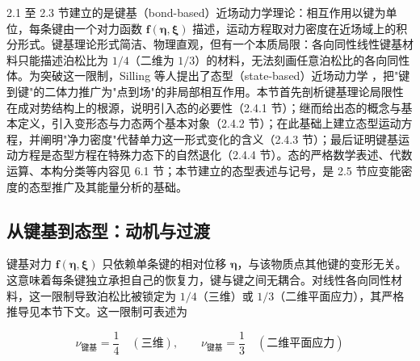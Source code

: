2.1 至 2.3 节建立的是键基（bond-based）近场动力学理论：相互作用以键为单位，每条键由一个对力函数 $\mathbf{f}(\boldsymbol{\eta},\boldsymbol{\xi})$ 描述，运动方程取对力密度在近场域上的积分形式。键基理论形式简洁、物理直观，但有一个本质局限：各向同性线性键基材料只能描述泊松比为 $1/4$（二维为 $1/3$）的材料，无法刻画任意泊松比的各向同性体。为突破这一限制，Silling 等人提出了态型（state-based）近场动力学 \cite{Silling2007}，把"键到键"的二体力推广为"点到场"的非局部相互作用。本节首先剖析键基理论局限性在成对势结构上的根源，说明引入态的必要性（2.4.1 节）；继而给出态的概念与基本定义，引入变形态与力态两个基本对象（2.4.2 节）；在此基础上建立态型运动方程，并阐明"净力密度"代替单力这一形式变化的含义（2.4.3 节）；最后证明键基运动方程是态型方程在特殊力态下的自然退化（2.4.4 节）。态的严格数学表述、代数运算、本构分类等内容见 6.1 节；本节建立的态型表述与记号，是 2.5 节应变能密度的态型推广及其能量分析的基础。

\subsection{从键基到态型：动机与过渡}

键基对力 $\mathbf{f}(\boldsymbol{\eta},\boldsymbol{\xi})$ 只依赖单条键的相对位移 $\boldsymbol{\eta}$，与该物质点其他键的变形无关。这意味着每条键独立承担自己的恢复力，键与键之间无耦合。对线性各向同性材料，这一限制导致泊松比被锁定为 $1/4$（三维）或 $1/3$（二维平面应力），其严格推导见本节下文。这一限制可表述为

\begin{equation}
  \nu_{\text{键基}}=\frac{1}{4}\quad(\text{三维}),\qquad \nu_{\text{键基}}=\frac{1}{3}\quad(\text{二维平面应力})
  \label{eq:poisson-limit}
\end{equation}

